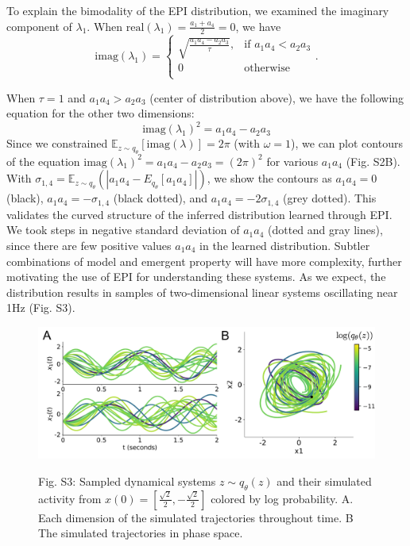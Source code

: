 \documentclass[11pt]{article}
\begin{document}
To explain the bimodality of the EPI distribution, we examined the imaginary component of $\lambda_1$.  When $\text{real}(\lambda_1) = \frac{a_1 + a_4}{2} = 0$, we have
\begin{equation}
\text{imag}(\lambda_1) = \begin{cases}
                             \sqrt{\frac{a_1 a_4 - a_2 a_3}{\tau}},  & \text{if } a_1 a_4 < a_2 a_3 \\
                             0 & \text{otherwise } \\
                         \end{cases}.
\end{equation}

When $\tau=1$ and $a_1 a_4 > a_2 a_3$ (center of distribution above), we have the following equation for the other two dimensions:
\begin{equation}
\text{imag}(\lambda_1)^2 = a_1 a_4 - a_2 a_3
\end{equation}
Since we constrained $\mathbb{E}_{z \sim q_\theta}\left[\text{imag}(\lambda)\right] = 2 \pi$ (with $\omega=1$), we can plot contours of the equation $\text{imag}(\lambda_1)^2 = a_1 a_4 - a_2 a_3 = (2 \pi)^2$ for various $a_1 a_4$ (Fig. S2B). 
With $\sigma_{1,4} = \mathbb{E}_{z \sim q_\theta}(|a_1 a_4 - E_{q_\theta}[a_1 a_4]|)$, we show the contours as $a_1 a_4 = 0$ (black), $a_1 a_4 = -\sigma_{1,4}$ (black dotted), and $a_1 a_4 = -2\sigma_{1,4}$ (grey dotted). 
This validates the curved structure of the inferred distribution learned through EPI.  
We took steps in negative standard deviation of $a_1 a_4$ (dotted and gray lines), since there are few positive values $a_1 a_4$ in the learned distribution.  
Subtler combinations of model and emergent property will have more complexity, further motivating the use of EPI for understanding these systems.  
As we expect, the distribution results in samples of two-dimensional linear systems oscillating near 1Hz (Fig. S3).

\begin{figure}
\begin{center}
\includegraphics[scale=0.5]{figures/figS3/figS3.pdf}
\end{center}
\begin{flushleft}
{\small Fig. S3: Sampled dynamical systems $z \sim q_\theta(z)$ and their simulated activity from $x(0) = [\frac{\sqrt{2}}{2}, -\frac{\sqrt{2}}{2}]$ colored by log probability. A. Each dimension of the simulated trajectories throughout time.  B  The simulated trajectories in phase space.}
\end{flushleft}
\end{figure}
\end{document}
